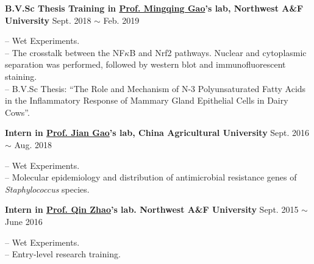 \textbf{B.V.Sc Thesis Training in \href{https://faculty.nwu.edu.cn/gaomingqing/en/index.htm}{Prof. Mingqing Gao}'s lab, Northwest A\&F University} \hfill Sept. 2018 $\sim$ Feb. 2019

{\small
-- Wet Experiments.\\
-- The crosstalk between the NF$\kappa$B and Nrf2 pathways. Nuclear and cytoplasmic separation was performed, followed by western blot and immunofluorescent staining.\\
-- B.V.Sc Thesis: ``The Role and Mechanism of N-3 Polyunsaturated Fatty Acids in the Inflammatory Response of Mammary Gland Epithelial Cells in Dairy Cows''.
}


\vspace{5pt}


\textbf{Intern in \href{https://cvm.cau.edu.cn/art/2017/9/12/art_41957_71.html}{Prof. Jian Gao}'s lab, China Agricultural University} \hfill Sept. 2016 $\sim$ Aug. 2018

{\small
-- Wet Experiments.\\
-- Molecular epidemiology and distribution of antimicrobial resistance genes of \textit{Staphylococcus} species\cite{zhao2018detection,qu2019molecular}.
}

\vspace{5pt}

\textbf{Intern in \href{https://dyxy.nwsuaf.edu.cn/en/People/FullProfessor/5e6012bf013a499c946289472b285795.htm}{Prof. Qin Zhao}'s lab. Northwest A\&F University} \hfill Sept. 2015 $\sim$ June 2016

{\small
-- Wet Experiments.\\
-- Entry-level research training.
}